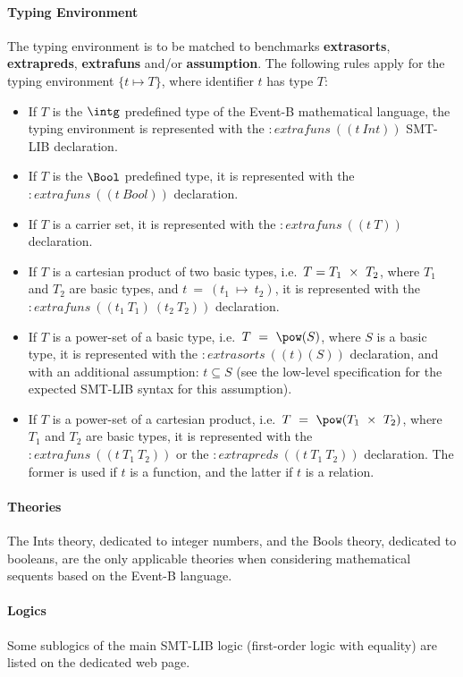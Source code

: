 \paragraph{Typing Environment}
The typing environment is to be matched to benchmarks \textbf{extrasorts}, \textbf{extrapreds}, \textbf{extrafuns} and/or \textbf{assumption}. The following rules apply for the typing environment $\{t \mapsto T\}$, where identifier $t$ has type $T$:
\begin{itemize}
\item If $T$ is the $\intg$ predefined type of the Event-B 
mathematical language, the typing environment is represented 
with the  $:extrafuns~((t~Int))$ SMT-LIB declaration.
\item If $T$ is the $\Bool$ predefined type, it is
represented with the $:extrafuns~((t~Bool))$ declaration.
\item If $T$ is a carrier set, it is represented
with the $:extrafuns~((t~T))$ declaration.
\item If $T$ is a cartesian product of two basic types, i.e.\
$T = T_1~\mathbin\times~T_2$, where $T_1$ and $T_2$ are basic types,
and $t~=~(t_1~\mapsto~t_2)$, it is represented with the 
$:extrafuns~((t_1~T_1)~(t_2~T_2))$ declaration.
\item If $T$ is a power-set of a basic type, i.e.\
$T~=~\pow(S)$, where $S$ is a basic type, it is represented 
with the $:extrasorts~((t) (S))$ declaration, and with an
additional assumption: $t \subseteq S$ (see the low-level
specification for the expected SMT-LIB syntax for this 
assumption).
\item If $T$ is a power-set of a cartesian product, i.e.\
$T~=~\pow(T_1~\cprod~T_2)$, where $T_1$ and $T_2$ are basic
types, it is represented with the $:extrafuns~((t~T_1~T_2))$ 
or the $:extrapreds~((t~T_1~T_2))$ declaration. The former
is used if $t$ is a function, and the latter if $t$ is a 
relation.
\end{itemize}

\paragraph{Theories}
The Ints theory, dedicated to integer numbers, and the Bools theory, dedicated to booleans, are the only applicable theories when considering mathematical  sequents based on the Event-B language. 

\paragraph{Logics}
Some sublogics of the main SMT-LIB logic (first-order logic with equality) are listed on the dedicated web page\cite{SMTLIB}.

